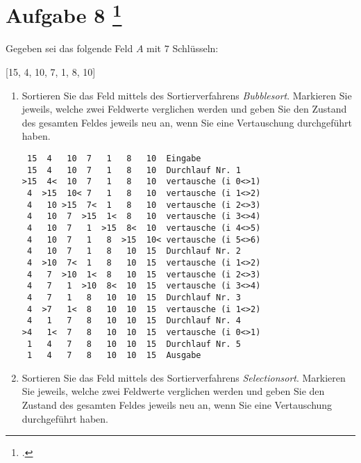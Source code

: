 \documentclass{bschlangaul-aufgabe}
\begin{document}
\section{Aufgabe 8
\footcite{examen:66115:2018:09}}

Gegeben sei das folgende Feld $A$ mit $7$ Schlüsseln:

\begin{center}
[15, 4, 10, 7, 1, 8, 10]
\end{center}

\begin{enumerate}


\item Sortieren Sie das Feld mittels des Sortierverfahrens
\emph{Bubblesort}. Markieren Sie jeweils, welche zwei Feldwerte
verglichen werden und geben Sie den Zustand des gesamten Feldes jeweils
neu an, wenn Sie eine Vertauschung durchgeführt haben.

\begin{liAntwort}
\begin{verbatim}
 15  4   10  7   1   8   10  Eingabe
 15  4   10  7   1   8   10  Durchlauf Nr. 1
>15  4<  10  7   1   8   10  vertausche (i 0<>1)
 4  >15  10< 7   1   8   10  vertausche (i 1<>2)
 4   10 >15  7<  1   8   10  vertausche (i 2<>3)
 4   10  7  >15  1<  8   10  vertausche (i 3<>4)
 4   10  7   1  >15  8<  10  vertausche (i 4<>5)
 4   10  7   1   8  >15  10< vertausche (i 5<>6)
 4   10  7   1   8   10  15  Durchlauf Nr. 2
 4  >10  7<  1   8   10  15  vertausche (i 1<>2)
 4   7  >10  1<  8   10  15  vertausche (i 2<>3)
 4   7   1  >10  8<  10  15  vertausche (i 3<>4)
 4   7   1   8   10  10  15  Durchlauf Nr. 3
 4  >7   1<  8   10  10  15  vertausche (i 1<>2)
 4   1   7   8   10  10  15  Durchlauf Nr. 4
>4   1<  7   8   10  10  15  vertausche (i 0<>1)
 1   4   7   8   10  10  15  Durchlauf Nr. 5
 1   4   7   8   10  10  15  Ausgabe
\end{verbatim}
\end{liAntwort}


\item Sortieren Sie das Feld mittels des Sortierverfahrens
\emph{Selectionsort}. Markieren Sie jeweils, welche zwei Feldwerte
verglichen werden und geben Sie den Zustand des gesamten Feldes jeweils
neu an, wenn Sie eine Vertauschung durchgeführt haben.


\end{enumerate}
\end{document}
